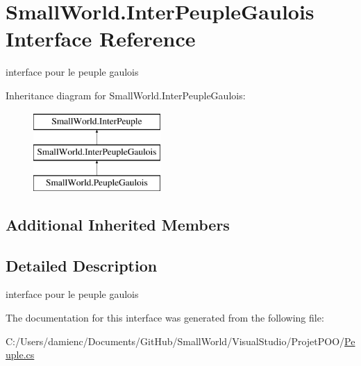 \hypertarget{interface_small_world_1_1_inter_peuple_gaulois}{\section{Small\-World.\-Inter\-Peuple\-Gaulois Interface Reference}
\label{interface_small_world_1_1_inter_peuple_gaulois}
}


interface pour le peuple gaulois  


Inheritance diagram for Small\-World.\-Inter\-Peuple\-Gaulois\-:\begin{figure}[H]
\begin{center}
\leavevmode
\includegraphics[height=3.000000cm]{interface_small_world_1_1_inter_peuple_gaulois}
\end{center}
\end{figure}
\subsection*{Additional Inherited Members}


\subsection{Detailed Description}
interface pour le peuple gaulois 

The documentation for this interface was generated from the following file\-:\begin{DoxyCompactItemize}
\item 
C\-:/\-Users/damienc/\-Documents/\-Git\-Hub/\-Small\-World/\-Visual\-Studio/\-Projet\-P\-O\-O/\hyperlink{_peuple_8cs}{Peuple.\-cs}\end{DoxyCompactItemize}
